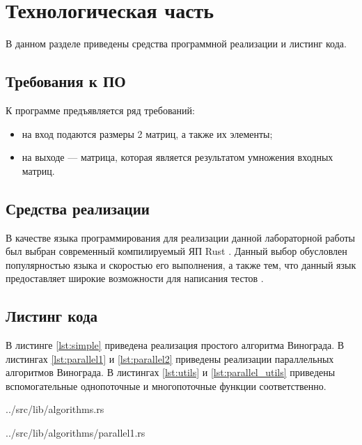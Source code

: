\chapter{Технологическая часть}

В данном разделе приведены средства программной реализации и листинг кода.

\section{Требования к ПО}

К программе предъявляется ряд требований:
\begin{itemize}
	\item на вход подаются размеры 2 матриц, а также их элементы;
	\item на выходе — матрица, которая является результатом умножения входных матриц.
\end{itemize}

\section{Средства реализации}

В качестве языка программирования для реализации данной лабораторной работы был выбран современный компилируемый ЯП Rust \cite{rustlang}. Данный выбор обусловлен популярностью языка и скоростью его выполнения, а также тем, что данный язык предоставляет широкие возможности для написания тестов \cite{rusttest}.

\section{Листинг кода}

В листинге \ref{lst:simple} приведена реализация простого алгоритма Винограда. В листингах \ref{lst:parallel1} и \ref{lst:parallel2} приведены реализации параллельных алгоритмов Винограда. В листингах \ref{lst:utils} и \ref{lst:parallel_utils} приведены вспомогательные однопоточные и многопоточные функции соответственно.

\begin{lstinputlisting}[
	caption={Последовательный алгоритм Винограда},
	label={lst:simple},
	style={rust},
	linerange={24-83}
]{../src/lib/algorithms.rs}
\end{lstinputlisting}

\begin{lstinputlisting}[
	caption={Параллельный алгоритм Винограда 1},
	label={lst:parallel1},
	style={rust},
	linerange={3-14}
]{../src/lib/algorithms/parallel1.rs}
\end{lstinputlisting}

